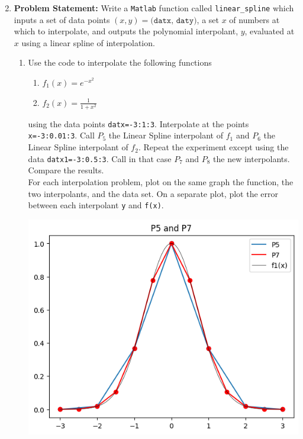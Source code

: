 \documentclass[12pt,twoside]{amsart}
\begin{document}
\begin{enumerate}
\begin{enumerate}
\begin{paracol}{2}
        \end{paracol}
        \begin{center}
        \end{center}
    \end{enumerate}
    \bigskip

    \item\textbf{Problem Statement:} Write a \texttt{Matlab} function called \texttt{linear\_spline} which inputs a set of data points $(x, y) = \texttt{(datx, daty)}$, a set $x$ of numbers at which to interpolate, and outputs the polynomial interpolant, $y$, evaluated at $x$ using a linear spline of interpolation.
    \begin{enumerate}
        \item Use the code to interpolate the following functions
        \begin{enumerate}
            \item $f_1(x) = e^{-x^2}$
            \item $f_2(x) = \frac{1}{1 + x^2}$
        \end{enumerate}
        using the data points \texttt{datx=-3:1:3}. Interpolate at the points \texttt{x=-3:0.01:3}. Call $P_5$ the Linear Spline interpolant of $f_1$ and $P_6$ the Linear Spline interpolant of $f_2$. Repeat the experiment except using the data \texttt{datx1=-3:0.5:3}. Call in that case $P_7$ and $P_8$ the new interpolants. Compare the results. \\
        For each interpolation problem, plot on the same graph the function, the two interpolants, and the data set. On a separate plot, plot the error between each interpolant \texttt{y} and \texttt{f(x)}.
        
        \begin{paracol}{2}
            \includegraphics[scale=0.45]{../img/problem7P5P7.png} \\

\end{paracol}
\end{enumerate}
\end{enumerate}
\end{document}
